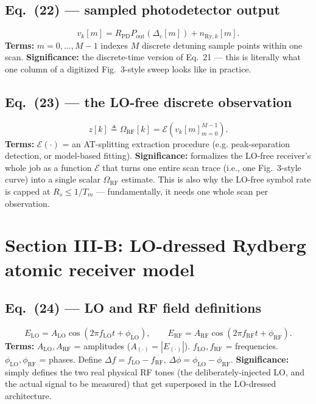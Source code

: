 \documentclass[11pt]{article}
\begin{document}
\subsection*{Eq.~(22) --- sampled photodetector output}
\begin{equation}
v_k[m] = R_\text{PD}P_\text{out}(\Delta_c[m])+n_{\text{Ry},k}[m]. \tag{22}
\end{equation}
\textbf{Terms:} $m=0,\dots,M-1$ indexes $M$ discrete detuning sample
points within one scan.
\textbf{Significance:} the discrete-time version of Eq.~21 --- this is
literally what one column of a digitized Fig.~3-style sweep looks like
in practice.

\subsection*{Eq.~(23) --- the LO-free discrete observation}
\begin{equation}
z[k] \triangleq \Omega_\text{RF}[k] = \mathcal E\left(v_k[m]_{m=0}^{M-1}\right). \tag{23}
\end{equation}
\textbf{Terms:} $\mathcal E(\cdot)$ = an AT-splitting extraction
procedure (e.g. peak-separation detection, or model-based fitting).
\textbf{Significance:} formalizes the LO-free receiver's whole job as a
function $\mathcal E$ that turns one entire scan trace (i.e., one
Fig.~3-style curve) into a single scalar $\Omega_\text{RF}$ estimate.
This is also why the LO-free symbol rate is capped at $R_s\le1/T_m$
--- fundamentally, it needs one whole scan per observation.

\section{Section III-B: LO-dressed Rydberg atomic receiver model}

\subsection*{Eq.~(24) --- LO and RF field definitions}
\begin{equation}
E_\text{LO} = A_\text{LO}\cos(2\pi f_\text{LO}t+\phi_\text{LO}), \qquad
E_\text{RF} = A_\text{RF}\cos(2\pi f_\text{RF}t+\phi_\text{RF}). \tag{24a, 24b}
\end{equation}
\textbf{Terms:} $A_\text{LO},A_\text{RF}$ = amplitudes ($A_{(\cdot)}=|E_{(\cdot)}|$).
$f_\text{LO},f_\text{RF}$ = frequencies. $\phi_\text{LO},\phi_\text{RF}$
= phases. Define $\Delta f=f_\text{LO}-f_\text{RF}$,
$\Delta\phi=\phi_\text{LO}-\phi_\text{RF}$.
\textbf{Significance:} simply defines the two real physical RF tones
(the deliberately-injected LO, and the actual signal to be measured)
that get superposed in the LO-dressed architecture.
\end{document}
